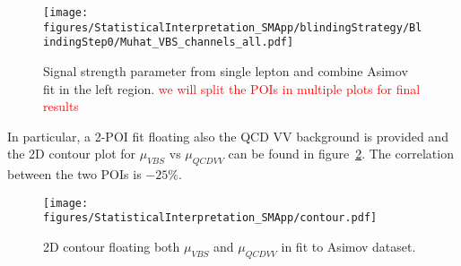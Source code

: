 \begin{figure}[h]
  \centering
  \texttt{[image: figures/StatisticalInterpretation\_SMApp/blindingStrategy/BlindingStep0/Muhat\_VBS\_channels\_all.pdf]}
  \caption{Signal strength parameter from single lepton and combine Asimov fit in the left region.
    \textcolor{red}{we will split the POIs in multiple plots for final results}
  }
  \label{fig:fit:sigStrenghtCombineStep1}
\end{figure}


In particular, a 2-POI fit floating also the QCD VV background is provided and the 2D contour plot for $\mu_{VBS}$ vs $\mu_{QCDVV}$ can be found in figure~\ref{fig:contour2D}.
The correlation between the two POIs is $-25\%$.

\begin{figure}[h]
  \centering
  \texttt{[image: figures/StatisticalInterpretation\_SMApp/contour.pdf]}
  \caption{2D contour floating both $\mu_{VBS}$ and $\mu_{QCDVV}$ in fit to Asimov dataset.}
\label{fig:contour2D}
\end{figure}



